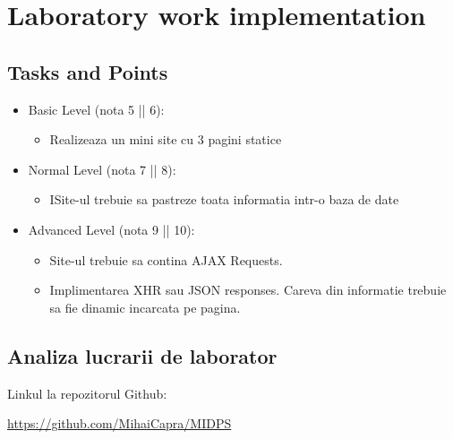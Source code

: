 \section{Laboratory work implementation}

\subsection{Tasks and Points}
\begin{itemize}
	\item Basic Level (nota 5 || 6):
	
	\begin{itemize}
		\item Realizeaza un mini site cu 3 pagini statice
	\end{itemize}
	
	\item Normal Level (nota 7 || 8):
	
	\begin{itemize}
		\item ISite-ul trebuie sa pastreze toata informatia intr-o baza de date
	\end{itemize}
	\item Advanced Level (nota 9 || 10):
	
	\begin{itemize}
		\item Site-ul trebuie sa contina AJAX Requests.
    	\item Implimentarea XHR sau JSON responses. Careva din informatie trebuie sa fie dinamic incarcata pe pagina.
	\end{itemize}
\end{itemize}
    



\subsection{Analiza lucrarii de laborator}

Linkul la repozitorul Github:\\
\begin{center}
\url{https://github.com/MihaiCapra/MIDPS}
\end{center}

